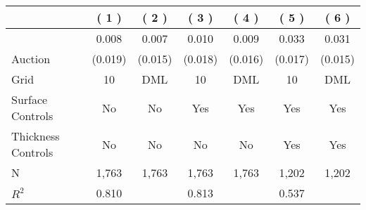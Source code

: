 
\begin{tabular}{lcccccc}
\toprule
 & ( 1 ) & ( 2 ) & ( 3 ) & ( 4 ) & ( 5 ) & ( 6 )\\
\midrule
 & 0.008 & 0.007 & 0.010 & 0.009 & 0.033 & 0.031\\

\multirow{-2}{*}{\raggedright\arraybackslash Auction} & (0.019) & (0.015) & (0.018) & (0.016) & (0.017) & (0.015)\\

\midrule
Grid & 10 & DML & 10 & DML & 10 & DML\\

Surface Controls & No & No & Yes & Yes & Yes & Yes\\

Thickness Controls & No & No & No & No & Yes & Yes\\

N & 1,763 & 1,763 & 1,763 & 1,763 & 1,202 & 1,202\\

$R^2$ & 0.810 &  & 0.813 &  & 0.537 & \\
\bottomrule
\end{tabular}
